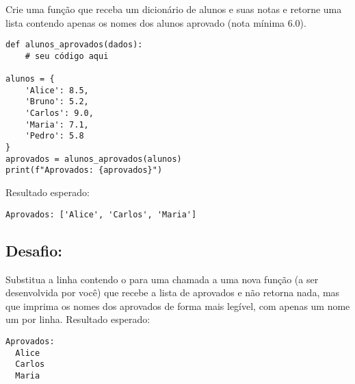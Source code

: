Crie uma função que receba um dicionário de alunos e suas notas e retorne uma lista contendo apenas os nomes dos alunos
aprovado (nota mínima 6.0).
\begin{verbatim}
def alunos_aprovados(dados):
    # seu código aqui

alunos = {
    'Alice': 8.5,
    'Bruno': 5.2,
    'Carlos': 9.0,
    'Maria': 7.1,
    'Pedro': 5.8
}
aprovados = alunos_aprovados(alunos)
print(f"Aprovados: {aprovados}")
\end{verbatim}

Resultado esperado:
\begin{verbatim}
Aprovados: ['Alice', 'Carlos', 'Maria']
\end{verbatim}

\subsection*{Desafio:}
Substitua a linha contendo o  para uma chamada a uma nova função (a ser desenvolvida por você) que
recebe a lista de aprovados e não retorna nada, mas que imprima os nomes dos aprovados de forma mais legível, com apenas
um nome um por linha.
Resultado esperado:
\begin{verbatim}
Aprovados:
  Alice
  Carlos
  Maria
\end{verbatim}




